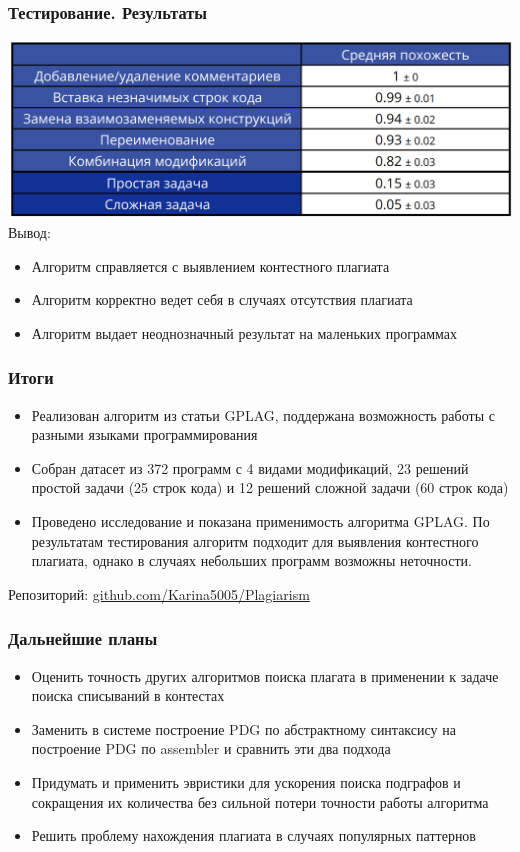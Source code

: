 \documentclass[10pt]{beamer}
\begin{document}
\begin{frame}\frametitle{Тестирование. Результаты}
	\hspace*{-0.4cm}
	\includegraphics[scale=0.7]{res0.png}
	Вывод: 
	\begin{itemize}
		\item Алгоритм справляется с выявлением контестного плагиата
		\item Алгоритм корректно ведет себя в случаях отсутствия плагиата
		\item Алгоритм выдает неоднозначный результат на маленьких программах
	\end{itemize}
	
\end{frame}


\begin{frame}\frametitle{Итоги}
	\begin{itemize}
		\item Реализован алгоритм из статьи GPLAG, поддержана возможность работы с разными языками программирования
		\item Собран датасет из 372 программ с 4 видами модификаций, 23 решений простой задачи (25 строк кода) и 12 решений сложной задачи (60 строк кода)
		\item Проведено исследование и показана применимость алгоритма GPLAG. По результатам тестирования алгоритм подходит для выявления контестного плагиата, однако в случаях небольших программ возможны неточности.
		\newline
	\end{itemize}

    Репозиторий: \href{https://github.com/Karina5005/Plagiarism}{\color{blue}github.com/Karina5005/Plagiarism}
\end{frame}

\begin{frame}\frametitle{Дальнейшие планы}
    \begin{itemize}
    	\item Оценить точность других алгоритмов поиска плагата в применении к задаче поиска списываний в контестах
        \item Заменить в системе построение PDG по абстрактному синтаксису на построение PDG по assembler и сравнить эти два подхода
        \item Придумать и применить эвристики для ускорения поиска подграфов и сокращения их количества без сильной потери точности работы алгоритма
        \item Решить проблему нахождения плагиата в случаях популярных паттернов
        
    \end{itemize}
\end{frame}
\end{document}
